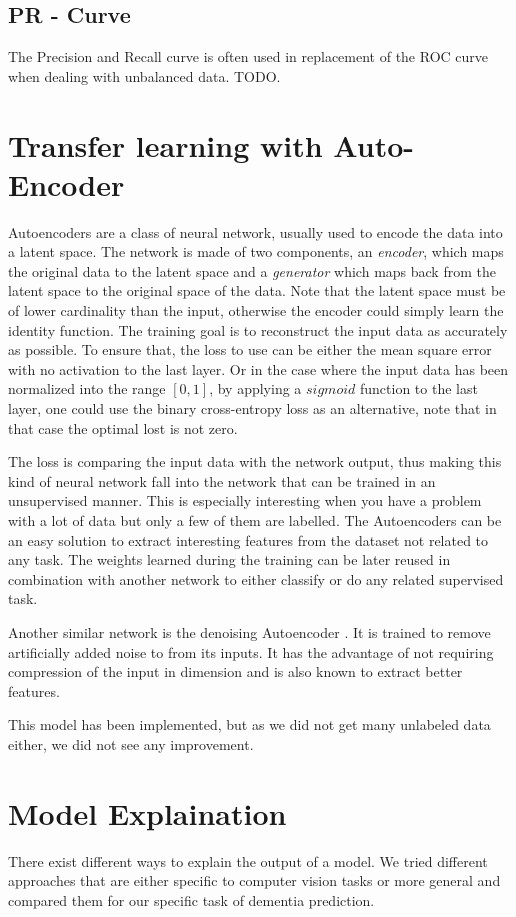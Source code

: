 \subsection{PR - Curve}
The Precision and Recall curve is often used in replacement of the ROC curve when dealing with unbalanced data. TODO.


\section{Transfer learning with Auto-Encoder}
Autoencoders are a class of neural network, usually used to encode the data into a latent space. The network is made of two components, an \textit{encoder}, which maps the original data to the latent space and a \textit{generator} which maps back from the latent space to the original space of the data. Note that the latent space must be of lower cardinality than the input, otherwise the encoder could simply learn the identity function. The training goal is to reconstruct the input data as accurately as possible. To ensure that, the loss to use can be either the mean square error with no activation to the last layer. Or in the case where the input data has been normalized into the range $[0, 1]$, by applying a $sigmoid$ function to the last layer, one could use the binary cross-entropy loss as an alternative, note that in that case the optimal lost is not zero.

The loss is comparing the input data with the network output, thus making this kind of neural network fall into the network that can be trained in an unsupervised manner. This is especially interesting when you have a problem with a lot of data but only a few of them are labelled. The Autoencoders can be an easy solution to extract interesting features from the dataset not related to any task. The weights learned during the training can be later reused in combination with another network to either classify or do any related supervised task.

Another similar network is the denoising Autoencoder \cite{denoising_autoencoder_10.5555/1756006.1953039}. It is trained to remove artificially added noise to from its inputs. It has the advantage of not requiring compression of the input in dimension and is also known to extract better features.

This model has been implemented, but as we did not get many unlabeled data either, we did not see any improvement.

\section{Model Explaination}
There exist different ways to explain the output of a model. We tried different approaches that are either specific to computer vision tasks or more general and compared them for our specific task of dementia prediction.


